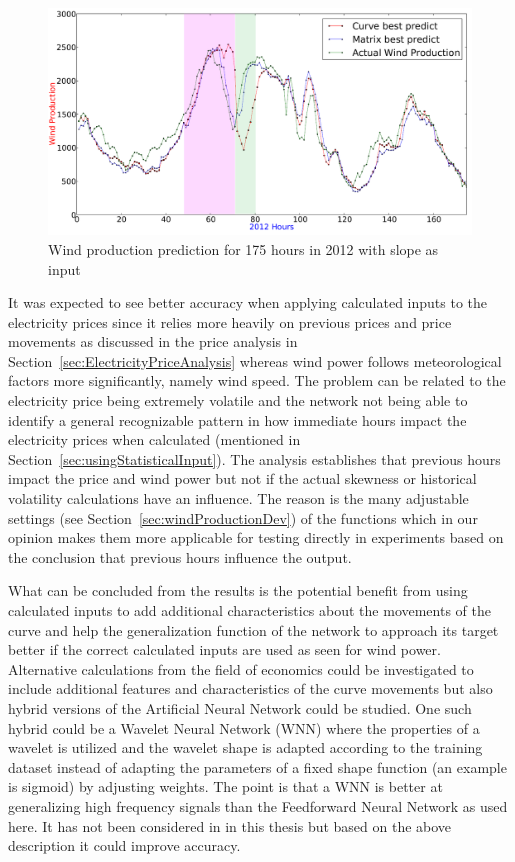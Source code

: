\begin{figure}[H]
\centering
\includegraphics[width=0.99\linewidth]{billeder/curveAnalysisWindProduction.png}
\caption{Wind production prediction for 175 hours in 2012 with slope as input}
\label{fig:basicCurveAnalysisGraphoForDiscussion}
\end{figure}

It was expected to see better accuracy when applying calculated inputs to the electricity prices since it relies more heavily on previous prices and price movements as discussed in the price analysis in Section~\ref{sec:ElectricityPriceAnalysis} whereas wind power follows meteorological factors more significantly, namely wind speed. The problem can be related to the electricity price being extremely volatile and the network not being able to identify a general recognizable pattern in how immediate hours impact the electricity prices when calculated (mentioned in Section~\ref{sec:usingStatisticalInput}). The analysis establishes that previous hours impact the price and wind power but not if the actual skewness or historical volatility calculations have an influence. The reason is the many adjustable settings (see Section~\ref{sec:windProductionDev}) of the functions which in our opinion makes them more applicable for testing directly in experiments based on the conclusion that previous hours influence the output. 

What can be concluded from the results is the potential benefit from using calculated inputs to add additional characteristics about the movements of the curve and help the generalization function of the network to approach its target better if the correct calculated inputs are used as seen for wind power. Alternative calculations from the field of economics could be investigated to include additional features and characteristics of the curve movements but also hybrid versions of the Artificial Neural Network could be studied. One such hybrid could be a Wavelet Neural Network (WNN) where the properties of a wavelet is utilized \cite{adaptiveWaveletANNElectricityMarkets} and the wavelet shape is adapted according to the training dataset instead of adapting the parameters of a fixed shape function (an example is sigmoid) by adjusting weights. The point is that a WNN is better at generalizing high frequency signals than the Feedforward Neural Network as used here. It has not been considered in in this thesis but based on the above description it could improve accuracy. 



